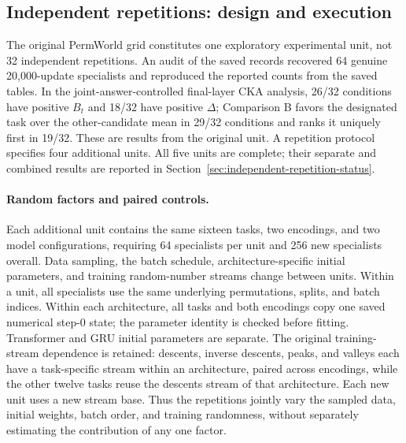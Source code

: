 \subsection{Independent repetitions: design and execution}
\label{sec:independentrepetition}

The original PermWorld grid constitutes one exploratory experimental unit,
not 32 independent repetitions. An audit of the saved records recovered 64
genuine 20,000-update specialists and reproduced the reported counts from
the saved tables. In the joint-answer-controlled final-layer CKA analysis,
26/32 conditions have positive $B_t$ and 18/32 have positive $\Delta$;
Comparison B favors the designated task over the other-candidate mean in
29/32 conditions and ranks it uniquely first in 19/32. These are results
from the original unit. A repetition protocol specifies four additional
units. All five units are complete; their separate and combined results
are reported in Section~\ref{sec:independent-repetition-status}.

\paragraph{Random factors and paired controls.}
Each additional unit contains the same sixteen tasks, two encodings, and
two model configurations, requiring 64 specialists per unit and 256 new
specialists overall. Data sampling, the batch schedule, architecture-specific
initial parameters, and training random-number streams change between
units. Within a unit, all specialists use the same underlying permutations,
splits, and batch indices. Within each architecture, all tasks and both
encodings copy one saved numerical step-0 state; the parameter identity is
checked before fitting. Transformer and GRU initial parameters are separate.
The original training-stream dependence is retained: descents, inverse
descents, peaks, and valleys each have a task-specific stream within an
architecture, paired across encodings, while the other twelve tasks reuse
the descents stream of that architecture. Each new unit uses a new stream
base. Thus the repetitions jointly vary the sampled data, initial weights,
batch order, and training randomness, without separately estimating the
contribution of any one factor.

